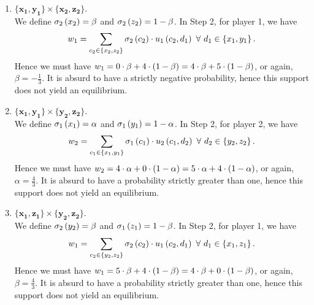 \begin{enumerate} [label=\Alph*. ]
\begin{enumerate} [label*= (\arabic*)]
    
    
    
    \item $\mathbf{\{x_1, y_1\}} \times \mathbf{\{x_2, z_2\}}$. \\
    We define $\sigma_{2} \left(x_2\right) = \beta$ and $\sigma_{2} \left(z_2\right) = 1 - \beta$. In Step 2, for player 1, we have
    \begin{equation*}
        w_1 = \sum_{c_2 \in \left\{x_2, z_2\right\}} \sigma_{2} \left(c_2\right) \cdot u_1 \left(c_2, d_1\right) \ \forall \ d_1 \in \left\{x_1, y_1\right\}.
    \end{equation*}
    Hence we must have $w_1 = 0 \cdot \beta + 4 \cdot \left(1 - \beta\right) = 4 \cdot \beta + 5 \cdot \left(1 - \beta\right)$, or again, $\beta = -\frac{1}{3}$. It is absurd to have a strictly negative probability, hence this support does not yield an equilibrium.
        
    
    \item $\mathbf{\{x_1, y_1\}} \times \mathbf{\{y_2, z_2\}}$. \\
    We define $\sigma_{1} \left(x_1\right) = \alpha$ and $\sigma_{1} \left(y_1\right) = 1 - \alpha$. In Step 2, for player 2, we have
    \begin{equation*}
        w_2 = \sum_{c_1 \in \left\{x_1, y_1\right\}} \sigma_{1} \left(c_1\right) \cdot u_2 \left(c_1, d_2\right) \ \forall \ d_2 \in \left\{y_2, z_2\right\}.
    \end{equation*}
    Hence we must have $w_2 = 4 \cdot \alpha + 0 \cdot \left(1 - \alpha\right) = 5 \cdot \alpha + 4 \cdot \left(1 - \alpha\right)$, or again, $\alpha = \frac{4}{3}$. It is absurd to have a probability strictly greater than one, hence this support does not yield an equilibrium.
    
    \item $\mathbf{\{x_1, z_1\}} \times \mathbf{\{y_2, z_2\}}$. \\
    We define $\sigma_{2} \left(y_2\right) = \beta$ and $\sigma_{1} \left(z_1\right) = 1 - \beta$. In Step 2, for player 1, we have
    \begin{equation*}
        w_1 = \sum_{c_2 \in \left\{y_2, z_2\right\}} \sigma_{2} \left(c_2\right) \cdot u_1 \left(c_2, d_1\right) \ \forall \ d_1 \in \left\{x_1, z_1\right\}.
    \end{equation*}
    Hence we must have $w_1 = 5 \cdot \beta + 4 \cdot \left(1 - \beta\right) = 4 \cdot \beta + 0 \cdot \left(1 - \beta\right)$, or again, $\beta = \frac{4}{3}$. It is absurd to have a probability strictly greater than one, hence this support does not yield an equilibrium.
    
    \vspace{3mm}
    

\end{enumerate}
\end{enumerate}
